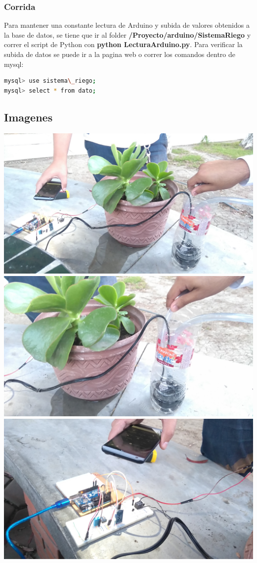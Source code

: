 \documentclass{article}
\begin{document}
\subsubsection{Corrida}
Para mantener una constante lectura de Arduino y subida de valores obtenidos a la base de datos, se tiene que ir al folder \textbf{/Proyecto/arduino/SistemaRiego} y correr el script de Python con \textbf{python LecturaArduino.py}.
\newline Para verificar la subida de datos se puede ir a la pagina web o correr los comandos dentro de mysql:
\begin{lstlisting}[language=bash]
mysql> use sistema\_riego;
mysql> select * from dato;
\end{lstlisting}

\subsection{Imagenes}
\includegraphics[width=\textwidth]{captura/1}
\includegraphics[width=\textwidth]{captura/2}
\includegraphics[width=\textwidth]{captura/3}
\end{document}
